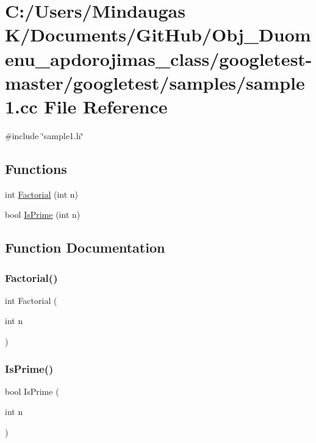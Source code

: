 \hypertarget{googletest-master_2googletest_2samples_2sample1_8cc}{}\section{C\+:/\+Users/\+Mindaugas K/\+Documents/\+Git\+Hub/\+Obj\+\_\+\+Duomenu\+\_\+apdorojimas\+\_\+class/googletest-\/master/googletest/samples/sample1.cc File Reference}
\label{googletest-master_2googletest_2samples_2sample1_8cc}
{\ttfamily \#include \char`\"{}sample1.\+h\char`\"{}}\newline
\subsection*{Functions}
\begin{DoxyCompactItemize}
\item 
int \mbox{\hyperlink{googletest-master_2googletest_2samples_2sample1_8cc_a0e7da4d7a69c5b5afb707807aa177017}{Factorial}} (int n)
\item 
bool \mbox{\hyperlink{googletest-master_2googletest_2samples_2sample1_8cc_a7093217f5edc11fe277d03bd064e5f11}{Is\+Prime}} (int n)
\end{DoxyCompactItemize}


\subsection{Function Documentation}
\mbox{\label{googletest-master_2googletest_2samples_2sample1_8cc_a0e7da4d7a69c5b5afb707807aa177017}} 
\subsubsection{\texorpdfstring{Factorial()}{Factorial()}}
{\footnotesize\ttfamily int Factorial (\begin{DoxyParamCaption}\item[{int}]{n }\end{DoxyParamCaption})}

\mbox{\label{googletest-master_2googletest_2samples_2sample1_8cc_a7093217f5edc11fe277d03bd064e5f11}} 
\subsubsection{\texorpdfstring{IsPrime()}{IsPrime()}}
{\footnotesize\ttfamily bool Is\+Prime (\begin{DoxyParamCaption}\item[{int}]{n }\end{DoxyParamCaption})}

